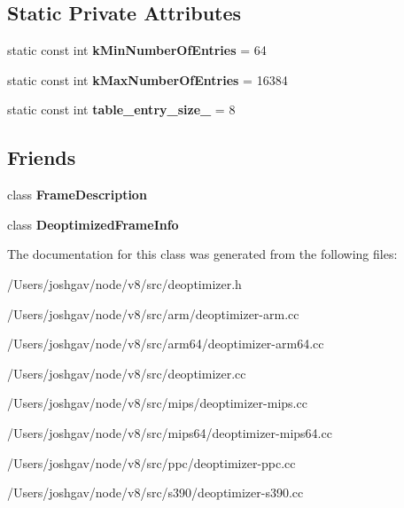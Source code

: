 \subsection*{Static Private Attributes}
\begin{DoxyCompactItemize}
\item 
static const int {\bfseries k\+Min\+Number\+Of\+Entries} = 64\hypertarget{classv8_1_1internal_1_1_deoptimizer_ad785f91dc6a6e0d1d9bf83588c6b6df9}{}\label{classv8_1_1internal_1_1_deoptimizer_ad785f91dc6a6e0d1d9bf83588c6b6df9}

\item 
static const int {\bfseries k\+Max\+Number\+Of\+Entries} = 16384\hypertarget{classv8_1_1internal_1_1_deoptimizer_a78e859a5ea7b0550952cdb7a8373040c}{}\label{classv8_1_1internal_1_1_deoptimizer_a78e859a5ea7b0550952cdb7a8373040c}

\item 
static const int {\bfseries table\+\_\+entry\+\_\+size\+\_\+} = 8\hypertarget{classv8_1_1internal_1_1_deoptimizer_a315d9f500c6e5fb98dc0980566ad051c}{}\label{classv8_1_1internal_1_1_deoptimizer_a315d9f500c6e5fb98dc0980566ad051c}

\end{DoxyCompactItemize}
\subsection*{Friends}
\begin{DoxyCompactItemize}
\item 
class {\bfseries Frame\+Description}\hypertarget{classv8_1_1internal_1_1_deoptimizer_a224be72dc184a8c14bfe381aba312774}{}\label{classv8_1_1internal_1_1_deoptimizer_a224be72dc184a8c14bfe381aba312774}

\item 
class {\bfseries Deoptimized\+Frame\+Info}\hypertarget{classv8_1_1internal_1_1_deoptimizer_ad768f50809f35947f37316cdfe284e92}{}\label{classv8_1_1internal_1_1_deoptimizer_ad768f50809f35947f37316cdfe284e92}

\end{DoxyCompactItemize}


The documentation for this class was generated from the following files\+:\begin{DoxyCompactItemize}
\item 
/\+Users/joshgav/node/v8/src/deoptimizer.\+h\item 
/\+Users/joshgav/node/v8/src/arm/deoptimizer-\/arm.\+cc\item 
/\+Users/joshgav/node/v8/src/arm64/deoptimizer-\/arm64.\+cc\item 
/\+Users/joshgav/node/v8/src/deoptimizer.\+cc\item 
/\+Users/joshgav/node/v8/src/mips/deoptimizer-\/mips.\+cc\item 
/\+Users/joshgav/node/v8/src/mips64/deoptimizer-\/mips64.\+cc\item 
/\+Users/joshgav/node/v8/src/ppc/deoptimizer-\/ppc.\+cc\item 
/\+Users/joshgav/node/v8/src/s390/deoptimizer-\/s390.\+cc\end{DoxyCompactItemize}
